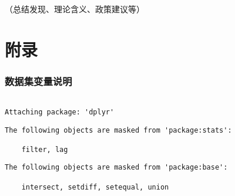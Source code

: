 \documentclass[
]{ctexart}
\begin{document}
（总结发现、理论含义、政策建议等）

\section{附录}\label{ux9644ux5f55}

\subsubsection{数据集变量说明}\label{ux6570ux636eux96c6ux53d8ux91cfux8bf4ux660e}

\begin{verbatim}

Attaching package: 'dplyr'
\end{verbatim}

\begin{verbatim}
The following objects are masked from 'package:stats':

    filter, lag
\end{verbatim}

\begin{verbatim}
The following objects are masked from 'package:base':

    intersect, setdiff, setequal, union
\end{verbatim}
\end{document}

